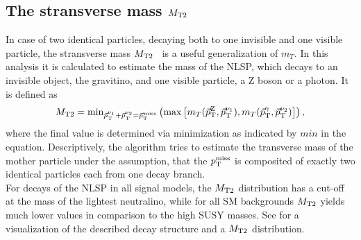 \subsection*{The stransverse mass $M_{\mathrm{T2}}$}
In case of two identical particles, decaying both to one invisible and one visible particle, the stransverse mass $M_{\mathrm{T2}}$~\cite{Mt2_1,Mt2_2} is a useful generalization of $m_T$. In this analysis it is calculated to estimate the mass of the NLSP, which decays to an invisible object, the gravitino, and one visible particle, a Z boson or a photon. It is defined as
\begin{equation}
 M_{\mathrm{T2}} = \text{min}_{{\vec p}_{\mathrm{T}}^{\nu_1}+{\vec p}_{\mathrm{T}}^{\nu_2}={\vec p}_{\mathrm{T}}^{\kern1pt\text{miss}}}\left(\text{max}\left[m_T({\vec p}_{\mathrm{T}}^{\mathrm{Z}},{\vec p}_{\mathrm{T}}^{\nu_1}),m_T({\vec p}_{\mathrm{T}}^{\gamma},{\vec p}_{\mathrm{T}}^{\nu_2})\right]\right),
\end{equation}
where the final value is determined via minimization as indicated by $min$ in the equation. Descriptively, the algorithm tries to estimate the transverse mass of the mother particle under the assumption, that the $p_{\mathrm{T}}^\text{miss}$ is composited of exactly two identical particles each from one decay branch.\\
For decays of the NLSP in all signal models, the $M_{\mathrm{T2}}$ distribution has a cut-off at the mass of the lightest neutralino, while for all SM backgrounds $M_{\mathrm{T2}}$ yields much lower values in comparison to the high SUSY masses. See  for a visualization of the described decay structure and a $M_{\mathrm{T2}}$ distribution.

